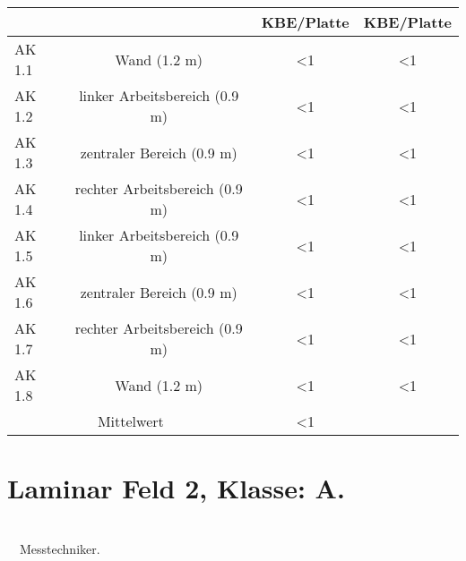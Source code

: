 \begin{Form}
{\begin{tabular}{|l|c|c|c|}
		& & KBE/Platte           & KBE/Platte   \\ \hline
		AK 1.1 & Wand (1.2 m)                     & \textless 1 & \textless 1 \\ \hline
		AK 1.2                         & linker Arbeitsbereich (0.9   m)  & \textless 1 & \textless 1 \\ \hline
		AK 1.3                         & zentraler Bereich (0.9 m)        & \textless 1 & \textless 1 \\ \hline
		AK 1.4                         & rechter Arbeitsbereich   (0.9 m) & \textless 1 & \textless 1 \\ \hline
		AK 1.5                         & linker Arbeitsbereich (0.9   m)  & \textless 1 & \textless 1 \\ \hline
		AK 1.6                         & zentraler Bereich (0.9 m)        & \textless 1 & \textless 1 \\ \hline
		AK 1.7                         & rechter Arbeitsbereich   (0.9 m) & \textless 1 & \textless 1 \\ \hline
		AK 1.8                         & Wand (1.2 m)                     & \textless 1 & \textless 1 \\ \hline
		\multicolumn{2}{|c|}{Mittelwert} & \textless 1 & \multicolumn{1}{c}{} \\
		\cline{1-3}
	\end{tabular}%
}



\section{Laminar Feld 2, Klasse: A.}\label{sec:LF2}


\kundeline \quad  \objekt \quad  \abteilung \quad  \betriebszustand \\[1.5ex]
{}~{}~Messtechniker.\\[1.5ex]



\end{Form}
